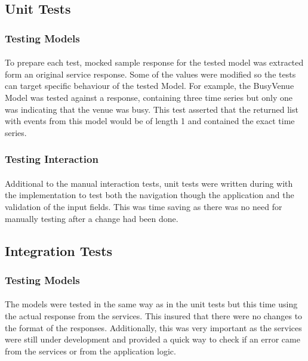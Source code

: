 \documentclass{l4proj}
\begin{document}
\subsection{Unit Tests}

\subsubsection{Testing Models}
\paragraph{}
To prepare each test, mocked sample response for the tested model was extracted form an original service response. Some of the values were modified so the tests can target specific behaviour of the tested Model. For example, the BusyVenue Model was tested against a response, containing three time series but only one was indicating that the venue was busy. This test asserted that the returned list with events from this model would be of length 1 and contained the exact time series. 

\subsubsection{Testing Interaction}
\paragraph{}
Additional to the manual interaction tests, unit tests were written during with the implementation to test both the navigation though the application and the validation of the input fields. This was time saving as there was no need for manually testing after a change had been done.  

\subsection{Integration Tests}

\subsubsection{Testing Models}
\paragraph{}
The models were tested in the same way as in the unit tests but this time using the actual response from the services. This insured that there were no changes to the format of the responses. Additionally, this was very important as the services were still under development and provided a quick way to check if an error came from the services or from the application logic.   
\end{document}

